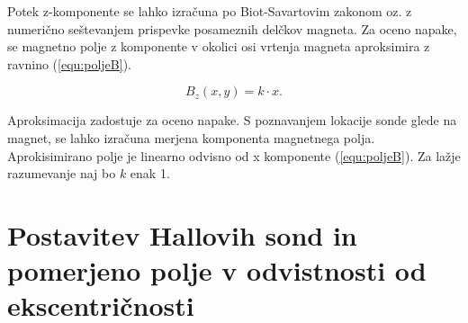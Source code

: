 Potek z-komponente se lahko izračuna po Biot-Savartovim zakonom oz. z numerično seštevanjem prispevke posameznih delčkov magneta. Za oceno napake, se magnetno polje z komponente v okolici osi vrtenja magneta aproksimira z ravnino (\ref{equ:poljeB}).

\begin{equation}
\label{equ:poljeB}
B_z(x,y)=k\cdot x.
\end{equation}

Aproksimacija zadostuje za oceno napake. S poznavanjem lokacije sonde glede na magnet, se lahko izračuna merjena komponenta magnetnega polja. Aprokisimirano polje je linearno odvisno od x komponente (\ref{equ:poljeB}). Za lažje razumevanje naj bo $k$ enak 1.

\section{Postavitev Hallovih sond in pomerjeno polje v odvistnosti od ekscentričnosti}
%
%
%
%
%
%
